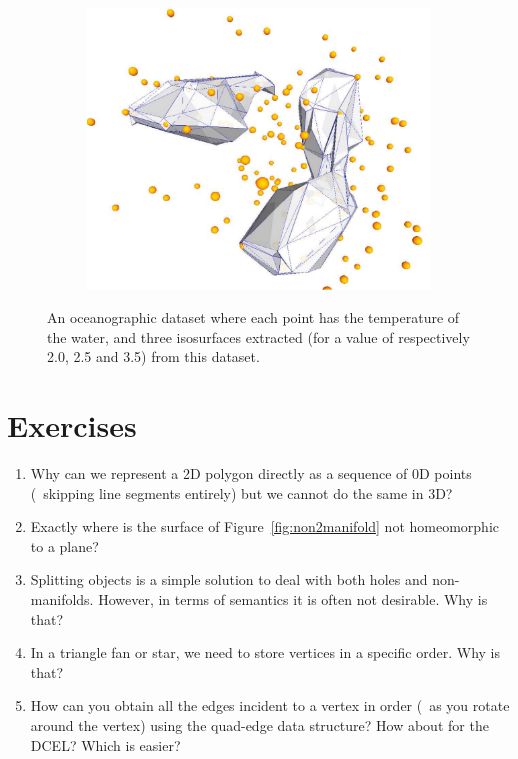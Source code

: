 \begin{figure}
\begin{subfigure}[b]{0.28\linewidth}
    \caption{}
  \end{subfigure}
  \qquad
  \begin{subfigure}[b]{0.28\linewidth}
    \centering
    \includegraphics[width=\textwidth]{figs/isosurface3}
    \caption{}
  \end{subfigure}
\caption[An oceanographic dataset with three isosurfaces]{An oceanographic dataset where each point has the temperature of the water, and three isosurfaces extracted (for a value of respectively 2.0, 2.5 and 3.5) from this dataset.}%
\label{fig:isosurface}
\end{figure}

%
\section{Exercises}

\begin{enumerate}
	\item Why can we represent a 2D polygon directly as a sequence of 0D points (\ie\ skipping line segments entirely) but we cannot do the same in 3D\@?
	\item Exactly where is the surface of Figure~\ref{fig:non2manifold} not homeomorphic to a plane?
	\item Splitting objects is a simple solution to deal with both holes and non-manifolds. However, in terms of semantics it is often not desirable. Why is that?
	\item In a triangle fan or star, we need to store vertices in a specific order. Why is that?
	\item How can you obtain all the edges incident to a vertex in order (\ie\ as you rotate around the vertex) using the quad-edge data structure? How about for the DCEL\@? Which is easier?
\end{enumerate}



